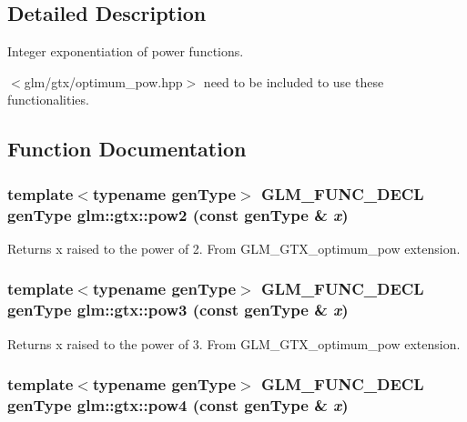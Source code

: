 \subsection{Detailed Description}
Integer exponentiation of power functions. 

$<$glm/gtx/optimum\_\-pow.hpp$>$ need to be included to use these functionalities. 

\subsection{Function Documentation}
\hypertarget{group__gtx__optimum__pow_g8c44a36cd695f8abc2444152606f6067}{
\subsubsection[pow2]{\setlength{\rightskip}{0pt plus 5cm}template$<$typename genType$>$ GLM\_\-FUNC\_\-DECL genType glm::gtx::pow2 (const genType \& {\em x})}}
\label{group__gtx__optimum__pow_g8c44a36cd695f8abc2444152606f6067}


Returns x raised to the power of 2. From GLM\_\-GTX\_\-optimum\_\-pow extension. \hypertarget{group__gtx__optimum__pow_gc304ffcd456eeb248c1a3820cd9d7784}{
\subsubsection[pow3]{\setlength{\rightskip}{0pt plus 5cm}template$<$typename genType$>$ GLM\_\-FUNC\_\-DECL genType glm::gtx::pow3 (const genType \& {\em x})}}
\label{group__gtx__optimum__pow_gc304ffcd456eeb248c1a3820cd9d7784}


Returns x raised to the power of 3. From GLM\_\-GTX\_\-optimum\_\-pow extension. \hypertarget{group__gtx__optimum__pow_g829e48dc50a8db13c225cef2aa618839}{
\subsubsection[pow4]{\setlength{\rightskip}{0pt plus 5cm}template$<$typename genType$>$ GLM\_\-FUNC\_\-DECL genType glm::gtx::pow4 (const genType \& {\em x})}}
\label{group__gtx__optimum__pow_g829e48dc50a8db13c225cef2aa618839}


